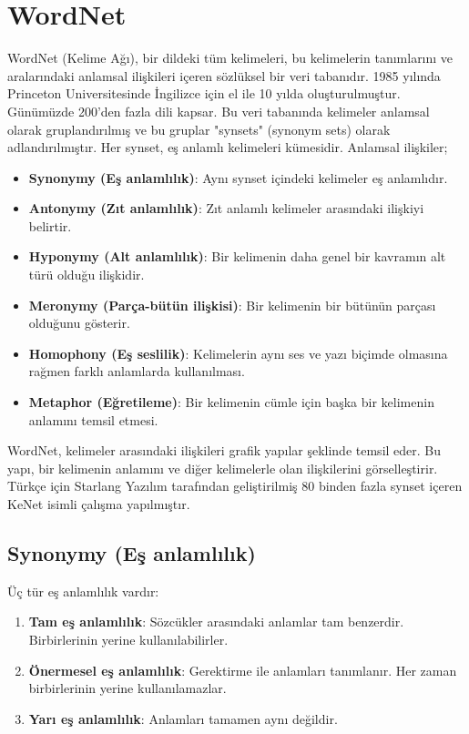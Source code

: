 \section{WordNet}

WordNet (Kelime Ağı), bir dildeki tüm kelimeleri, bu kelimelerin tanımlarını ve aralarındaki anlamsal ilişkileri içeren sözlüksel bir veri tabanıdır. 1985 yılında Princeton Universitesinde İngilizce için el ile 10 yılda oluşturulmuştur. Günümüzde 200'den fazla dili kapsar.  Bu veri tabanında kelimeler anlamsal olarak gruplandırılmış ve bu gruplar "synsets" (synonym sets)  olarak adlandırılmıştır. Her synset, eş anlamlı kelimeleri kümesidir. Anlamsal ilişkiler;

\begin{itemize}
	\item \textbf{Synonymy (Eş anlamlılık)}: Aynı synset içindeki kelimeler eş anlamlıdır. 
	\item \textbf{Antonymy (Zıt anlamlılık)}: Zıt anlamlı kelimeler arasındaki ilişkiyi belirtir.
	\item \textbf{Hyponymy (Alt anlamlılık)}: Bir kelimenin daha genel bir kavramın alt türü olduğu ilişkidir.
	\item \textbf{Meronymy (Parça-bütün ilişkisi)}: Bir kelimenin bir bütünün parçası olduğunu gösterir.
	\item \textbf{Homophony (Eş seslilik)}: Kelimelerin aynı ses ve yazı biçimde olmasına rağmen farklı anlamlarda kullanılması.
	\item \textbf{Metaphor (Eğretileme)}: Bir kelimenin cümle için başka bir kelimenin anlamını temsil etmesi.
\end{itemize}

WordNet, kelimeler arasındaki ilişkileri grafik yapılar şeklinde temsil eder. Bu yapı, bir kelimenin anlamını ve diğer kelimelerle olan ilişkilerini görselleştirir. Türkçe için Starlang Yazılım tarafından geliştirilmiş 80 binden fazla synset içeren KeNet isimli çalışma yapılmıştır.

\subsection{Synonymy (Eş anlamlılık)}
Üç tür eş anlamlılık vardır:

\begin{enumerate}
	\item \textbf{Tam eş anlamlılık}: Sözcükler arasındaki anlamlar tam benzerdir. Birbirlerinin yerine kullanılabilirler.
	\item \textbf{Önermesel eş anlamlılık}: Gerektirme ile anlamları tanımlanır. Her zaman birbirlerinin yerine kullanılamazlar.
	\item \textbf{Yarı eş anlamlılık}: Anlamları tamamen aynı değildir.
\end{enumerate}

